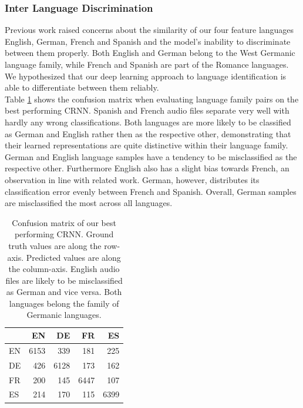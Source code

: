 \subsubsection{Inter Language Discrimination} 
\label{sec:lang_discrimination}

Previous work\cite{montavon2009deep} raised concerns about the similarity of our four feature languages \textendash{} English, German, French and Spanish \textendash{} and the model's inability to discriminate between them properly. Both English and German belong to the West Germanic language family, while French and Spanish are part of the Romance languages. We hypothesized that our deep learning approach to language identification is able to differentiate between them reliably. \\
Table \ref{tab:language_family_crnn} shows the confusion matrix when evaluating language family pairs on the best performing CRNN. Spanish and French audio files separate very well with hardly any wrong classifications. Both languages are more likely to be classified as German and English rather then as the respective other, demonstrating that their learned representations are quite distinctive within their language family. \\
German and English language samples have a tendency to be misclassified as the respective other. Furthermore English also has a slight bias towards French, an observation in line with related work\cite{werkmeister2016practical}. German, however, distributes its classification error evenly between French and Spanish. Overall, German samples are misclassified the most across all languages.


	
	\begin{table}[]
	\centering
	\begin{tabularx}{\textwidth}{l|rrrr}
	      & EN     & DE     & FR     & ES \\ \midrule
    EN  & \cellcolor{lightgray} 6153   & 339    & 181    & 225 \\
    DE  & 426    & \cellcolor{lightgray} 6128   & 173    & 162 \\
    FR  & 200    & 145    &  \cellcolor{lightgray} 6447   & 107 \\
    ES  & 214    & 170    & 115    & \cellcolor{lightgray} 6399 \\
	\end{tabularx}
	\caption{Confusion matrix of our best performing CRNN. Ground truth values are along the row-axis. Predicted values are along the column-axis. English audio files are likely to be misclassified as German and vice versa. Both languages belong the family of Germanic languages. }
	\label{tab:language_family_crnn}
	\end{table}

